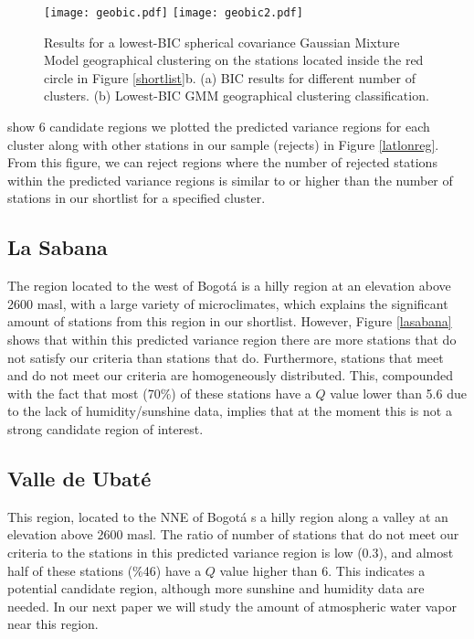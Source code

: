 \documentclass[12pt]{iopart}
\begin{document}
\begin{figure}
\begin{center}
\texttt{[image: geobic.pdf]}
\texttt{[image: geobic2.pdf]}
\caption{Results  for a lowest-BIC spherical covariance Gaussian Mixture Model geographical clustering on the stations located inside the red circle in Figure \ref{shortlist}b. (a) BIC results for different number of clusters. (b) Lowest-BIC GMM geographical clustering classification.}\label{geobic}
\end{center}
\end{figure}

 show 6 candidate regions we plotted the predicted variance regions for each cluster along with other stations in our sample (rejects) in Figure \ref{latlonreg}. From this figure, we can reject regions where the number of rejected stations within the predicted variance regions is similar to or higher than the number of stations in our shortlist for a specified cluster.

\subsection{La Sabana}

The region located to the west of Bogot\'a is a hilly region at an elevation above 2600 masl, with a large variety of microclimates, which explains the significant amount of stations from this region in our shortlist. However, Figure \ref{lasabana} shows that within this predicted variance region there are more stations that do not satisfy our criteria than stations that do. Furthermore, stations that meet and do not meet our criteria are homogeneously distributed. This, compounded with the fact that most (70\%) of these stations have a $Q$ value lower than 5.6 due to the lack of humidity/sunshine data, implies that at the moment this is not a strong candidate region of interest.
\subsection{Valle de Ubat\'e}

This region, located to the NNE of Bogot\'a s a hilly region along a valley at an elevation above 2600 masl. The ratio of number of stations that do not meet our criteria to the stations in this predicted variance region is low (0.3), and almost half of these stations (\%46) have a $Q$ value higher than 6. This indicates a potential candidate region, although more  sunshine and humidity data are needed. In our next paper we will study the amount of atmospheric water vapor near this region.
\end{document}
